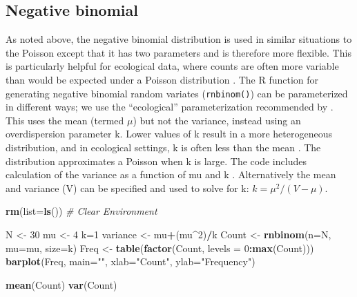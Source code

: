 \documentclass[
]{krantz}
\makeatletter
\newenvironment{Shaded}{\begin{snugshade}}{\end{snugshade}}
\newcommand{\AttributeTok}[1]{\textcolor[rgb]{0.27,0.27,0.27}{#1}}
\newcommand{\CommentTok}[1]{\textcolor[rgb]{0.37,0.37,0.37}{\textit{#1}}}
\newcommand{\DecValTok}[1]{\textcolor[rgb]{0.06,0.06,0.06}{#1}}
\newcommand{\FunctionTok}[1]{\textcolor[rgb]{0.27,0.27,0.27}{\textbf{#1}}}
\newcommand{\NormalTok}[1]{#1}
\newcommand{\OtherTok}[1]{\textcolor[rgb]{0.37,0.37,0.37}{#1}}
\newcommand{\SpecialCharTok}[1]{\textcolor[rgb]{0.43,0.43,0.43}{\textbf{#1}}}
\newcommand{\StringTok}[1]{\textcolor[rgb]{0.5,0.5,0.5}{#1}}
\newenvironment{kframe}{%
\medskip{}
\setlength{\fboxsep}{.8em}
 \def\at@end@of@kframe{}%
 \ifinner\ifhmode%
  \def\at@end@of@kframe{\end{minipage}}%
  \begin{minipage}{\columnwidth}%
 \fi\fi%
 \def\FrameCommand##1{\hskip\@totalleftmargin \hskip-\fboxsep
 \colorbox{shadecolor}{##1}\hskip-\fboxsep
     \hskip-\linewidth \hskip-\@totalleftmargin \hskip\columnwidth}%
 \MakeFramed {\advance\hsize-\width
   \@totalleftmargin\z@ \linewidth\hsize
   \@setminipage}}%
 {\par\unskip\endMakeFramed%
 \at@end@of@kframe}
\renewenvironment{Shaded}{\begin{kframe}}{\end{kframe}}
\makeatother
\begin{document}
\hypertarget{negative-binomial}{%
\subsection{Negative binomial}\label{negative-binomial}}

As noted above, the negative binomial distribution is used in similar situations to the Poisson except that it has two parameters and is therefore more flexible. This is particularly helpful for ecological data, where counts are often more variable than would be expected under a Poisson distribution \citep{bolker2008, link.barker_2009}. The R function for generating negative binomial random variates (\texttt{rnbinom()}) can be parameterized in different ways; we use the ``ecological'' parameterization recommended by \citet{bolker2008}. This uses the mean (termed \(\mu\)) but not the variance, instead using an overdispersion parameter k. Lower values of k result in a more heterogeneous distribution, and in ecological settings, k is often less than the mean \citep{bolker2008}. The distribution approximates a Poisson when k is large. The code includes calculation of the variance as a function of mu and k \citep{bolker2008}. Alternatively the mean and variance (V) can be specified and used to solve for k: \(k = \mu^2/(V-\mu)\).

\begin{Shaded}
\begin{Highlighting}[]
\FunctionTok{rm}\NormalTok{(}\AttributeTok{list=}\FunctionTok{ls}\NormalTok{()) }\CommentTok{\# Clear Environment}

\NormalTok{N }\OtherTok{\textless{}{-}} \DecValTok{30}
\NormalTok{mu }\OtherTok{\textless{}{-}} \DecValTok{4}
\NormalTok{k}\OtherTok{=}\DecValTok{1}
\NormalTok{variance }\OtherTok{\textless{}{-}}\NormalTok{ mu}\SpecialCharTok{+}\NormalTok{(mu}\SpecialCharTok{\^{}}\DecValTok{2}\NormalTok{)}\SpecialCharTok{/}\NormalTok{k}
\NormalTok{Count }\OtherTok{\textless{}{-}} \FunctionTok{rnbinom}\NormalTok{(}\AttributeTok{n=}\NormalTok{N, }\AttributeTok{mu=}\NormalTok{mu, }\AttributeTok{size=}\NormalTok{k)}
\NormalTok{Freq }\OtherTok{\textless{}{-}} \FunctionTok{table}\NormalTok{(}\FunctionTok{factor}\NormalTok{(Count, }\AttributeTok{levels =} \DecValTok{0}\SpecialCharTok{:}\FunctionTok{max}\NormalTok{(Count)))}
\FunctionTok{barplot}\NormalTok{(Freq, }\AttributeTok{main=}\StringTok{""}\NormalTok{, }\AttributeTok{xlab=}\StringTok{"Count"}\NormalTok{, }\AttributeTok{ylab=}\StringTok{"Frequency"}\NormalTok{)}

\FunctionTok{mean}\NormalTok{(Count)}
\FunctionTok{var}\NormalTok{(Count)}
\end{Highlighting}
\end{Shaded}
\end{document}
